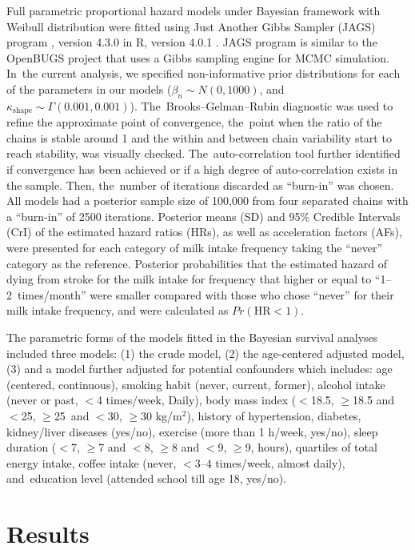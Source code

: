 \documentclass[nutrients,article,accept,moreauthors,pdftex]{Definitions/mdpi}
\begin{document}
Full parametric proportional hazard models under Bayesian framework with
Weibull distribution were fitted using Just Another Gibbs Sampler (JAGS)
program \citep{Plummer2003}, version 4.3.0 in R, version 4.0.1
\citep{RCT2020}. JAGS program is similar to the OpenBUGS
\citep{Lunn2009} project that uses a Gibbs sampling engine for MCMC
simulation. In~the current analysis, we specified non-informative prior
distributions for each of the parameters in our models
(\(\beta_n \sim N(0, 1000)\), and~\(\kappa_{\text{shape}} \sim \Gamma(0.001, 0.001)\)). The~Brooks--Gelman--Rubin diagnostic \citep{Brooks1998} was used to refine the
approximate point of convergence, the~point when the ratio of the chains
is stable around 1 and the within and between chain variability start to
reach stability, was visually checked. The~auto-correlation tool further
identified if convergence has been achieved or if a high degree of
auto-correlation exists in the sample. Then, the~number of iterations
discarded as ``burn-in'' was chosen. All models had a posterior sample
size of 100,000 from four separated chains with a ``burn-in'' of 2500
iterations. Posterior means (SD) and 95\% Credible Intervals (CrI) of
the estimated hazard ratios (HRs), as well as acceleration factors (AFs),
were presented for each category of milk intake frequency taking the
``never'' category as the reference. Posterior probabilities that the
estimated hazard of dying from stroke for the milk intake for frequency
that higher or equal to ``1--2~times/month'' were smaller compared with
those who chose ``never'' for their milk intake frequency, and were calculated
as \(Pr(\text{HR} < 1)\).

The parametric forms of the models fitted in the Bayesian survival
analyses included three models: (1) the crude model, (2) the age-centered
adjusted model, (3) and a model further adjusted for potential
confounders which includes: age (centered, continuous), smoking habit
(never, current, former), alcohol intake (never or past, \(<\)4
times/week, Daily), body mass index (\(<\)18.5, \(\geq\)18.5 and \(<\)25, \(\geq\)25~and \(<\)30, \(\geq\)30 kg/m\(^2\)), history of
hypertension, diabetes, kidney/liver diseases (yes/no), exercise (more
than 1 h/week, yes/no), sleep duration (\(<\)7, \(\geq\)7 and \(<\)8, \(\geq\)8 and \(<\)9, \(\geq\)9, hours), quartiles of total energy
intake, coffee intake (never, \(<\)3--4 times/week, almost daily), and~education level (attended school till age 18, yes/no).



\hypertarget{results}{%
\section{Results}\label{results}}
\end{document}
